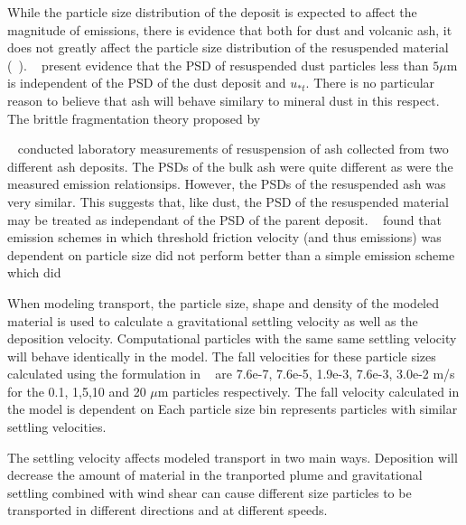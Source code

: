 \documentclass[draft]{agujournal2018}
\begin{document}
While the particle size distribution of the deposit is expected to affect the magnitude of emissions, there is evidence that
both for dust and volcanic ash, it does not greatly affect the particle size distribution of the resuspended material (~\citep{Mahowald14,DRI}).
~\cite{Kok11, Kok11b, Mahowald14} present evidence that the PSD of resuspended dust particles less than $5\mu\mathrm{m}$ is independent of the PSD of the dust deposit and $u_{*t}$.
There is no particular reason to believe that ash will behave similary to mineral dust in this respect. The brittle fragmentation theory proposed by ~\cite{Kok11} 


~\cite{DRI} conducted laboratory measurements of resuspension of ash collected from two different ash deposits. The PSDs of the bulk ash were quite different 
as were the measured emission relationsips. However, the PSDs of the resuspended ash was very similar. This suggests that, like dust, the PSD of the resuspended material may be treated as independant of the PSD of the parent deposit. 
~\cite{Folch14} found that emission schemes in which threshold friction velocity (and thus emissions) was dependent on particle size did not perform better than
a simple emission scheme which did


When modeling transport, the particle size, shape and density of the modeled material is used to calculate a gravitational settling velocity as well as the deposition velocity.
Computational particles with the same same settling velocity will behave identically in the model. 
The fall velocities for these particle sizes calculated using the formulation in ~\cite{Ganser} are 
7.6e-7, 7.6e-5, 1.9e-3, 7.6e-3, 3.0e-2 m/s for the 0.1, 1,5,10 and 20 $\mu\mathrm{m}$ particles respectively. 
The fall velocity calculated in the model is dependent on 
Each particle size bin represents particles with similar settling velocities. 

The settling velocity affects modeled transport in
two main ways. Deposition will decrease the amount of material in the tranported plume and gravitational settling combined with wind
shear can cause different size particles to be transported in different directions and at different speeds. 
\end{document}
